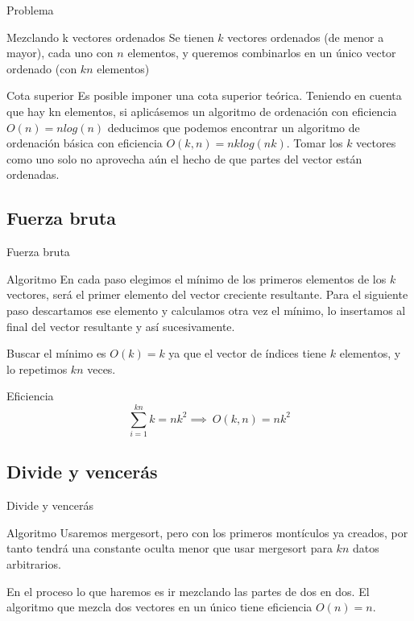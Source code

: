
\begin{frame}{Problema}
	\begin{block}{Mezclando k vectores ordenados}
	Se tienen $k$ vectores ordenados (de menor a mayor), cada uno con $n$ elementos, y 				queremos combinarlos en un único vector ordenado (con $kn$ elementos)
	\end{block}

	\begin{block}{Cota superior}
	Es posible imponer una cota superior teórica. Teniendo en cuenta que hay kn elementos, 	si aplicásemos un algoritmo 	de ordenación con eficiencia $O(n) = nlog(n)$ deducimos 			que podemos encontrar un algoritmo de ordenación básica con eficiencia $O(k, n) = 
	nklog(nk)$. Tomar los $k$ vectores como uno solo no aprovecha aún el hecho de que 			partes del vector están ordenadas.
	\end{block}
\end{frame}

\subsection{Fuerza bruta}
\begin{frame}{Fuerza bruta}
	\begin{block}{Algoritmo}
	En cada paso elegimos el mínimo de los primeros elementos de los $k$ vectores, será el 	primer elemento del vector creciente resultante.
	Para el siguiente paso descartamos ese elemento y calculamos otra vez el mínimo, lo 			insertamos al final del vector resultante y así sucesivamente.

	Buscar el mínimo es $O(k)=k$ ya que el vector de índices tiene $k$ 							elementos, y lo repetimos $kn$ veces.
	\end{block}
	
	\begin{block}{Eficiencia}
	\[\sum_{i=1}^{kn}k = nk^2 \implies \ O(k,n)=nk^2\]
	\end{block}
\end{frame}

\subsection{Divide y vencerás}
\begin{frame}{Divide y vencerás}
	\begin{block}{Algoritmo}
	Usaremos mergesort, pero con los primeros montículos ya creados, por tanto tendrá una 		constante oculta menor que usar mergesort para $kn$ datos arbitrarios. 
	
	En el proceso lo que haremos es ir mezclando las partes de dos en dos. El algoritmo 			que mezcla dos vectores en un único tiene eficiencia $O(n) = n$.
	\end{block}
\end{frame}

